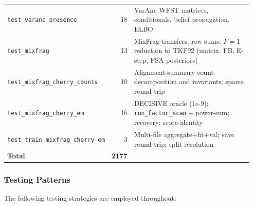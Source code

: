 \begin{table}[htbp]
\begin{tabular}{@{}lrl@{}}
\texttt{test\_varanc\_presence} & 18 & VarAnc WFST matrices, conditionals, belief propagation, ELBO \\
\texttt{test\_mixfrag} & 13 & MixFrag transfers; row sums; $F{=}1$ reduction to TKF92 (matrix, FB, E-step, FSA posteriors) \\
\texttt{test\_mixfrag\_cherry\_counts} & 10 & Alignment-summary count decomposition and invariants; sparse round-trip \\
\texttt{test\_mixfrag\_cherry\_em} & 16 & DECISIVE oracle (1e-9); \texttt{run\_factor\_scan}$\equiv$power-sum; recovery; score-identity \\
\texttt{test\_train\_mixfrag\_cherry\_em} & 3 & Multi-file aggregate+fit+val; save round-trip; split resolution \\
\midrule
\textbf{Total} & \textbf{2177} & \\
\bottomrule
\end{tabular}
\end{table}

\subsubsection{Testing Patterns}

The following testing strategies are employed throughout:

